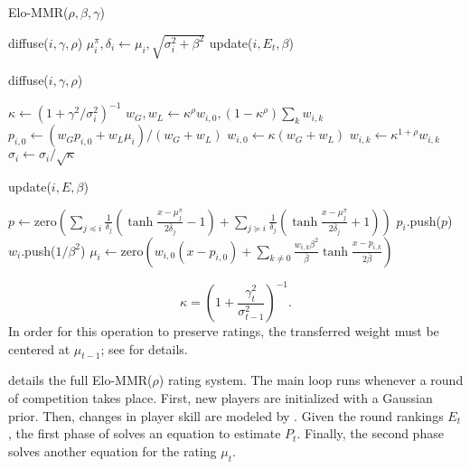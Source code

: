 \setlength{\floatsep}{0pt}
\setlength{\textfloatsep}{1em}
\begin{algorithm}[t]
\caption{Elo-MMR($\rho,\beta, \gamma$)}
\label{alg:main}
\begin{algorithmic}
\ENDIF
\STATE diffuse($i,\gamma,\rho$)
\STATE $\mu^\pi_i, \delta_i \gets \mu_i,\sqrt{\sigma_i^2 + \beta^2}$
\ENDFOR
\STATE update($i,E_t,\beta$)
\ENDFOR
\ENDFOR
\end{algorithmic}
\end{algorithm}
\begin{algorithm}[t]
\caption{diffuse($i,\gamma,\rho$)}
\label{alg:diffuse}
\begin{algorithmic}
\STATE $\kappa \gets (1+\gamma^2/\sigma_i^2)^{-1}$
\STATE $w_G, w_L \gets \kappa^\rho w_{i,0}, (1-\kappa^\rho) \sum_{k} w_{i,k}$
\STATE $p_{i,0} \gets (w_G p_{i,0} + w_L \mu_i) / (w_G+w_L)$
\STATE $w_{i,0} \gets \kappa (w_G+w_L)$
\STATE $w_{i,k} \gets \kappa^{1+\rho}w_{i,k}$
\ENDFOR
\STATE $\sigma_i \gets \sigma_i / \sqrt\kappa$
\end{algorithmic}
\end{algorithm}
\begin{algorithm}[t]
\caption{update($i,E,\beta$)}
\label{alg:update}
\begin{algorithmic}
\STATE $p \gets \mathrm{zero}\left(\sum_{j\preceq i}\frac{1}{\delta_j}\left( \tanh\frac {x - \mu^\pi_j} {2\bar\delta_j} - 1 \right) + \sum_{j\succeq i}\frac{1}{\delta_j}\left( \tanh\frac {x - \mu^\pi_j} {2\bar\delta_j} + 1 \right)\right)$
\STATE $p_i$.push($p$)
\STATE $w_i$.push($1/\beta^2$)
\STATE $\mu_i \gets \mathrm{zero}\left(w_{i,0}(x-p_{i,0}) + \sum_{k\ne 0} \frac{w_{i,k}\beta^2}{\bar\beta} \tanh \frac {x-p_{i,k}} {2\bar\beta}\right)$
\end{algorithmic}
\end{algorithm}

\[\kappa = \left(1 + \frac{\gamma_t^2}{\sigma_{t-1}^2}\right)^{-1}.\]
In order for this operation to preserve ratings, the transferred weight must be centered at $\mu_{t-1}$; see  for details.

 details the full Elo-MMR($\rho$) rating system. The main loop runs whenever a round of competition takes place. First, new players are initialized with a Gaussian prior. Then, changes in player skill are modeled by . Given the round rankings $E_t$, the first phase of  solves an equation to estimate $P_t$. Finally, the second phase solves another equation for the rating $\mu_t$. 

